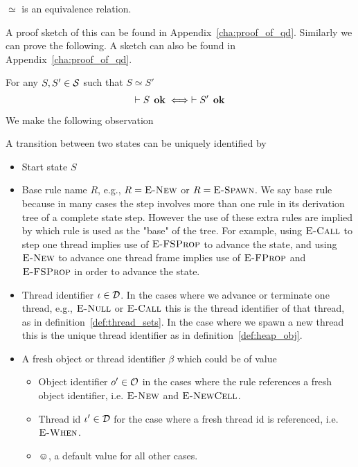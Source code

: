 \begin{proposition} \label{prop:eqrel}
  $\simeq$ is an equivalence relation.
\end{proposition}

A proof sketch of this can be found in Appendix~\ref{cha:proof_of_qd}.
Similarly we can prove the following. A sketch can also be found in
Appendix~\ref{cha:proof_of_qd}.
\begin{proposition} \label{prop:eqrel_stateok}
  For any $S, S' \in \mathcal{S}$ such that $S \simeq S'$
  \begin{equation}
    \vdash S \:\: \mbox{\bf ok} \iff \vdash S' \:\: \mbox{\bf ok}
  \end{equation}
\end{proposition}

We make the following observation
\begin{claim}
  A transition between two states can be uniquely identified by
  \begin{itemize}
    \item Start state $S$
    \item Base rule name $R$, e.g., $R = \mbox{{\sc E-New}}$ or $R = \mbox{\sc E-Spawn}$. We say base rule
      because in many cases the step involves more than one rule in its
      derivation tree of a complete state step. However the use of these extra
      rules are implied by which rule is used as the "base" of the tree. For
      example, using $\mbox{\sc E-Call}$ to step one thread implies use of $\mbox{\sc E-FSProp}$ to
      advance the state, and using $\mbox{{\sc E-New}}$ to advance one thread frame implies
      use of $\mbox{\sc E-FProp}$ and $\mbox{\sc E-FSProp}$ in order to advance the state.
    \item Thread identifier $\iota \in \mathcal{D}$. In the cases where we advance or terminate
      one thread, e.g., $\mbox{{\sc E-Null}}$ or $\mbox{\sc E-Call}$ this is the thread identifier of
      that thread, as in definition~\ref{def:thread_sets}. In the case where we
      spawn a new thread this is the unique thread identifier as in
      definition~\ref{def:heap_obj}.
    \item A fresh object or thread identifier $\beta$ which could be of value
      \begin{itemize}
        \item Object identifier $o' \in \mathcal{O}$ in the cases where the rule
          references a fresh object identifier, i.e. $\mbox{{\sc E-New}}$ and $\mbox{{\sc E-NewCell}}$.
        \item Thread id $\iota' \in \mathcal{D}$ for the case where a fresh thread id is
          referenced, i.e. $\mbox{{\sc E-When}}$.
        \item $\smiley$, a default value for all other cases.
      \end{itemize}
  \end{itemize}
\end{claim}

